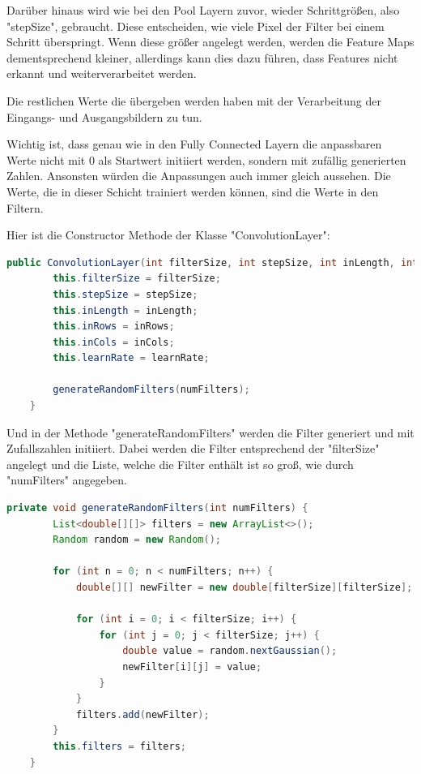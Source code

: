 \documentclass[12pt]{article}
\begin{document}
Darüber hinaus wird wie bei den Pool Layern zuvor, wieder Schrittgrößen, also "stepSize", gebraucht. Diese entscheiden, wie viele Pixel der Filter bei einem Schritt überspringt. Wenn diese größer angelegt werden, werden die Feature Maps dementsprechend kleiner, allerdings kann dies dazu führen, dass Features nicht erkannt und weiterverarbeitet werden. 

Die restlichen Werte die übergeben werden haben mit der Verarbeitung der Eingangs- und Ausgangsbildern zu tun.

Wichtig ist, dass genau wie in den Fully Connected Layern die anpassbaren Werte nicht mit 0 als Startwert initiiert werden, sondern mit zufällig generierten Zahlen. Ansonsten würden die Anpassungen auch immer gleich aussehen. Die Werte, die in dieser Schicht trainiert werden können, sind die Werte in den Filtern.

Hier ist die Constructor Methode der Klasse "ConvolutionLayer":

\begin{lstlisting}[language=Java]
public ConvolutionLayer(int filterSize, int stepSize, int inLength, int inRows, int inCols, int numFilters, double learnRate) {
        this.filterSize = filterSize;
        this.stepSize = stepSize;
        this.inLength = inLength;
        this.inRows = inRows;
        this.inCols = inCols;
        this.learnRate = learnRate;

        generateRandomFilters(numFilters);
    }
\end{lstlisting}

Und in der Methode "generateRandomFilters" werden die Filter generiert und mit Zufallszahlen initiiert. Dabei werden die Filter entsprechend der "filterSize" angelegt und die Liste, welche die Filter enthält ist so groß, wie durch "numFilters" angegeben.

\begin{lstlisting}[language=Java]
private void generateRandomFilters(int numFilters) {
        List<double[][]> filters = new ArrayList<>();
        Random random = new Random();

        for (int n = 0; n < numFilters; n++) {
            double[][] newFilter = new double[filterSize][filterSize];

            for (int i = 0; i < filterSize; i++) {
                for (int j = 0; j < filterSize; j++) {
                    double value = random.nextGaussian();
                    newFilter[i][j] = value;
                }
            }
            filters.add(newFilter);
        }
        this.filters = filters;
    }
\end{lstlisting}
\end{document}
